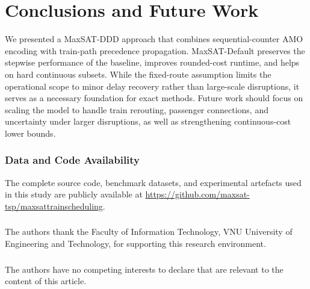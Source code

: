 \documentclass[runningheads]{llncs}
\let\oldbibliography
\renewcommand{}[1]{%
  \let\oldthebibliography\thebibliography
  \renewcommand{\thebibliography}[1]{%
    \oldthebibliography{##1}%
    \setlength{\itemsep}{0pt plus 0.2pt}%
    \setlength{\parsep}{0pt}%
  }%
  \oldbibliography{#1}%
}
\begin{document}
\section{Conclusions and Future Work}

We presented a MaxSAT-DDD approach that combines sequential-counter AMO
encoding with train-path precedence propagation. MaxSAT-Default preserves the
stepwise performance of the baseline, improves rounded-cost runtime, and helps
on hard continuous subsets. While the fixed-route assumption limits the operational scope to minor delay recovery rather than large-scale disruptions, it serves as a necessary foundation for exact methods. Future work should focus on scaling the model to handle train rerouting, passenger connections, and uncertainty under larger disruptions, as well as strengthening continuous-cost lower bounds.

\subsubsection{Data and Code Availability}
The complete source code, benchmark datasets, and experimental artefacts used in
this study are publicly available at
\url{https://github.com/maxsat-tsp/maxsattrainscheduling}.

\begin{credits}
\subsubsection{\ackname}
The authors thank the Faculty of Information Technology, VNU University of
Engineering and Technology, for supporting this research environment.

\subsubsection{\discintname}
The authors have no competing interests to declare that are relevant to the
content of this article.
\end{credits}



\end{document}
